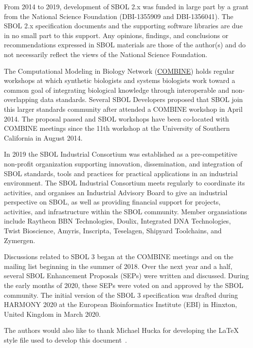 From 2014 to 2019, development of SBOL 2.x was funded in large part by a grant from the National Science Foundation (DBI-1355909 and DBI-1356041).  The SBOL 2.x specification documents and the supporting software libraries are due in no small part to this support. Any opinions, findings, and conclusions or recommendations expressed in SBOL materials are those of the author(s) and do not necessarily reflect the views of the National Science Foundation.

The Computational Modeling in Biology Network (\href{http://www.co.mbine.org}{COMBINE}) holds regular workshops at which synthetic biologists and systems biologists work toward a common goal of integrating biological knowledge through interoperable and non-overlapping data standards. Several SBOL Developers proposed that SBOL join this larger standards community after attended a COMBINE workshop in April 2014.  The proposal passed and SBOL workshops have been co-located with COMBINE meetings since the 11th workshop at the University of Southern California in August 2014.

In 2019 the SBOL Industrial Consortium was established as a pre-competitive non-profit organization supporting innovation, dissemination, and integration of SBOL standards, tools and practices for practical applications in an industrial environment. The SBOL Industrial Consortium meets regularly to coordinate its activities, and organises an Industrial Advisory Board to give an industrial perspective on SBOL, as well as providing financial support for projects, activities, and infrastructure within the SBOL community.
Member organsiations include Raytheon BBN Technologies, Doulix, Integrated DNA Technologies, Twist Bioscience, Amyris, Inscripta, Teselagen, Shipyard Toolchains, and Zymergen.

Discussions related to SBOL 3 began at the COMBINE meetings and on the mailing list beginning in the summer of 2018.  Over the next year and a half, several SBOL Enhancement Proposals (SEPs) were written and discussed.  During the early months of 2020, these SEPs were voted on and approved by the SBOL community.  The initial version of the SBOL 3 specification was drafted during HARMONY 2020 at the European Bioinformatics Institute (EBI) in Hinxton, United Kingdom in March 2020.

The authors would also like to thank Michael Hucka for developing the LaTeX style file used to develop this document~\citep{hucka2017sbmlpkgspec}.

